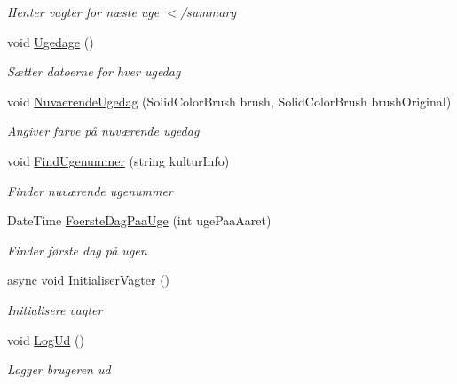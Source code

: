 \begin{DoxyCompactItemize}
\begin{DoxyCompactList}\small\item\em Henter vagter for næste uge $<$/summary \end{DoxyCompactList}\item 
void \hyperlink{class__1aarsproeve_1_1_view_model_1_1_vagtplan_view_model_af345ce712696e7401e284d71323e9619}{Ugedage} ()
\begin{DoxyCompactList}\small\item\em Sætter datoerne for hver ugedag \end{DoxyCompactList}\item 
void \hyperlink{class__1aarsproeve_1_1_view_model_1_1_vagtplan_view_model_a584ab28ecfddbb2248d7b55a3ed10a34}{Nuvaerende\+Ugedag} (Solid\+Color\+Brush brush, Solid\+Color\+Brush brush\+Original)
\begin{DoxyCompactList}\small\item\em Angiver farve på nuværende ugedag \end{DoxyCompactList}\item 
void \hyperlink{class__1aarsproeve_1_1_view_model_1_1_vagtplan_view_model_a5e3b5ba40e74748da6c018f8547d8baa}{Find\+Ugenummer} (string kultur\+Info)
\begin{DoxyCompactList}\small\item\em Finder nuværende ugenummer \end{DoxyCompactList}\item 
Date\+Time \hyperlink{class__1aarsproeve_1_1_view_model_1_1_vagtplan_view_model_a8b8894a622f861e335c3e171a4ba93bc}{Foerste\+Dag\+Paa\+Uge} (int uge\+Paa\+Aaret)
\begin{DoxyCompactList}\small\item\em Finder første dag på ugen \end{DoxyCompactList}\item 
async void \hyperlink{class__1aarsproeve_1_1_view_model_1_1_vagtplan_view_model_aa6d918d8d3f79ae33e12ac5a357efd83}{Initialiser\+Vagter} ()
\begin{DoxyCompactList}\small\item\em Initialisere vagter \end{DoxyCompactList}\item 
void \hyperlink{class__1aarsproeve_1_1_view_model_1_1_vagtplan_view_model_a543ec6d690130a11d074bc58ba9f1552}{Log\+Ud} ()
\begin{DoxyCompactList}\small\item\em Logger brugeren ud \end{DoxyCompactList}\end{DoxyCompactItemize}
